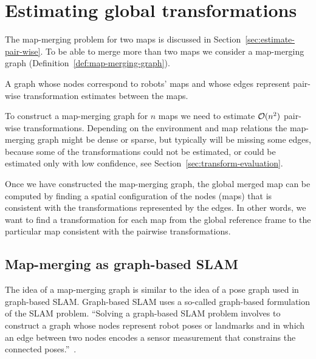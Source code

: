 
\section{Estimating global transformations}
\label{sec:estimate-global}

The map-merging problem for two maps is discussed in Section~\ref{sec:estimate-pair-wise}. To be able to merge more than two maps we consider a map-merging graph (Definition~\ref{def:map-merging-graph}).

\begin{defn}
    \label{def:map-merging-graph}
    A graph whose nodes correspond to robots' maps and whose edges represent pair-wise transformation estimates between the maps.
\end{defn}

To construct a map-merging graph for $n$ maps we need to estimate $\operatorname{\mathcal{O}}(n^2)$ pair-wise transformations. Depending on the environment and map relations the map-merging graph might be dense or sparse, but typically will be missing some edges, because some of the transformations could not be estimated, or could be estimated only with low confidence, see Section~\ref{sec:transform-evaluation}.

Once we have constructed the map-merging graph, the global merged map can be computed by finding a spatial configuration of the nodes (maps) that is consistent with the transformations represented by the edges. In other words, we want to find a transformation for each map from the global reference frame to the particular map consistent with the pairwise transformations.

\subsection{Map-merging as graph-based SLAM}

The idea of a map-merging graph is similar to the idea of a pose graph used in graph-based \gls{SLAM}. Graph-based \gls{SLAM} uses a so-called graph-based formulation of the \gls{SLAM} problem. ``Solving a graph-based \gls{SLAM} problem involves to construct a graph whose nodes represent robot poses or landmarks and in which an edge between two nodes encodes a sensor measurement that constrains the connected poses.''~\citep{grisetti2010tutorial}.

